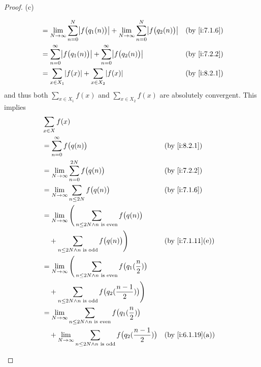 \begin{proof}{(c)}
\begin{itemize}
\begin{align*}
             & = \lim_{N \to \infty} \sum_{n = 0}^N \abs{f\big(q_1(n)\big)} + \lim_{N \to \infty} \sum_{n = 0}^N \abs{f\big(q_2(n)\big)} &  & \by{i:7.1.6}     \\
             & = \sum_{n = 0}^\infty \abs{f\big(q_1(n)\big)} + \sum_{n = 0}^\infty \abs{f\big(q_2(n)\big)}                               &  & \by{i:7.2.2}     \\
             & = \sum_{x \in X_1} \abs{f(x)} + \sum_{x \in X_2} \abs{f(x)}                                                               &  & \by{i:8.2.1}
          \end{align*}
          and thus both \(\sum_{x \in X_1} f(x)\) and \(\sum_{x \in X_2} f(x)\) are absolutely convergent.
          This implies
          \begin{align*}
             & \sum_{x \in X} f(x)                                                                                                                 \\
             & = \sum_{n = 0}^\infty f\big(q(n)\big)                                                                         &  & \by{i:8.2.1}     \\
             & = \lim_{N \to \infty} \sum_{n = 0}^{2N} f\big(q(n)\big)                                                       &  & \by{i:7.2.2}     \\
             & = \lim_{N \to \infty} \sum_{n \leq 2N} f\big(q(n)\big)                                                        &  & \by{i:7.1.6}     \\
             & = \lim_{N \to \infty} \Bigg(\sum_{n \leq 2N \land n \text{ is even}} f\big(q(n)\big)                                                \\
             & \quad + \sum_{n \leq 2N \land n \text{ is odd}} f\big(q(n)\big)\Bigg)                                         &  & \by{i:7.1.11}[e] \\
             & = \lim_{N \to \infty} \Bigg(\sum_{n \leq 2N \land n \text{ is even}} f\big(q_1(\dfrac{n}{2})\big)                                   \\
             & \quad + \sum_{n \leq 2N \land n \text{ is odd}} f\big(q_2(\dfrac{n - 1}{2})\big)\Bigg)                                              \\
             & = \lim_{N \to \infty} \sum_{n \leq 2N \land n \text{ is even}} f\big(q_1(\dfrac{n}{2})\big)                                         \\
             & \quad + \lim_{N \to \infty} \sum_{n \leq 2N \land n \text{ is odd}} f\big(q_2(\dfrac{n - 1}{2})\big)          &  & \by{i:6.1.19}[a] \\

\end{align*}
\end{itemize}
\end{proof}
